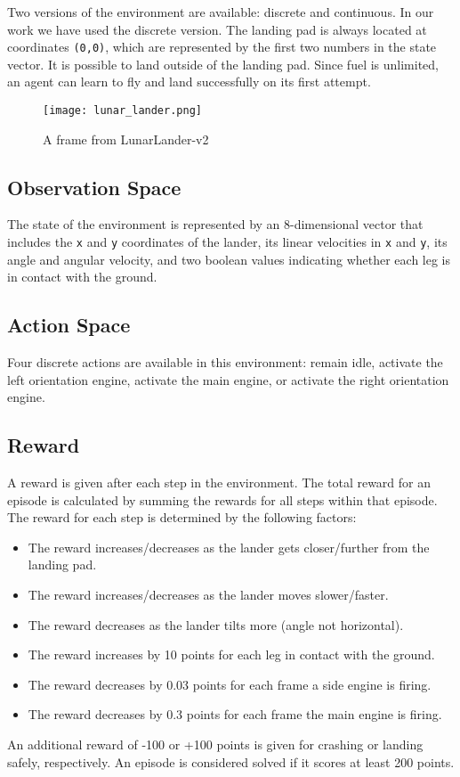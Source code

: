 \documentclass{article} %
\begin{document}
Two versions of the environment are available: discrete and continuous. In our work we have used the discrete version. The landing pad is always located at coordinates \verb|(0,0)|, which are represented by the first two numbers in the state vector. It is possible to land outside of the landing pad. Since fuel is unlimited, an agent can learn to fly and land successfully on its first attempt.

\begin{figure}[h]
    \begin{center}
        \texttt{[image: lunar\_lander.png]}
    \end{center}
    \caption{A frame from LunarLander-v2}
    \label{fig:mcar-rendering}
\end{figure}

\subsection{Observation Space}
The state of the environment is represented by an 8-dimensional vector that includes the \verb|x| and \verb|y| coordinates of the lander, its linear velocities in \verb|x| and \verb|y|, its angle and angular velocity, and two boolean values indicating whether each leg is in contact with the ground.

\subsection{Action Space}
Four discrete actions are available in this environment: remain idle, activate the left orientation engine, activate the main engine, or activate the right orientation engine.

\subsection{Reward}

A reward is given after each step in the environment. The total reward for an episode is calculated by summing the rewards for all steps within that episode. The reward for each step is determined by the following factors: \begin{itemize} \item The reward increases/decreases as the lander gets closer/further from the landing pad. \item The reward increases/decreases as the lander moves slower/faster. \item The reward decreases as the lander tilts more (angle not horizontal). \item The reward increases by 10 points for each leg in contact with the ground. \item The reward decreases by 0.03 points for each frame a side engine is firing. \item The reward decreases by 0.3 points for each frame the main engine is firing. \end{itemize} An additional reward of -100 or +100 points is given for crashing or landing safely, respectively. An episode is considered solved if it scores at least 200 points.
\end{document}
